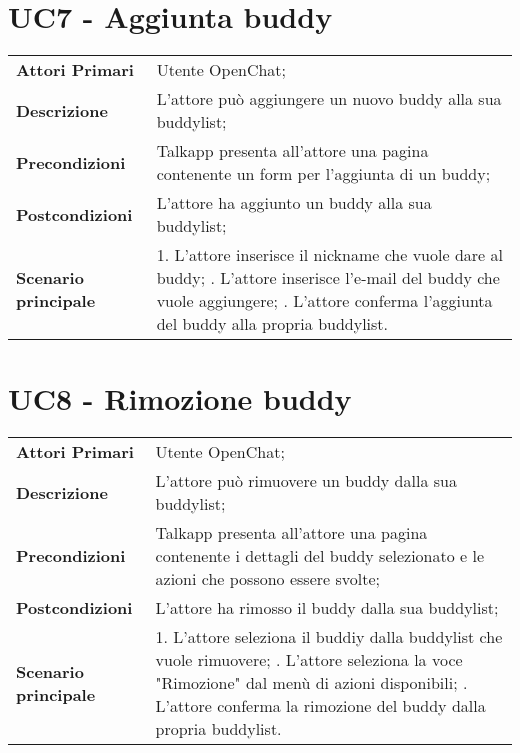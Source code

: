\section{UC7 - Aggiunta buddy}
\begin{center}
	\bgroup
	\def\arraystretch{1.8}     
	\begin{longtable}{  p{4cm} | p{9.5cm} } 
		\textbf{Attori Primari} & Utente OpenChat; \\ 
		\textbf{Descrizione} &  L'attore può aggiungere un nuovo buddy alla sua buddylist; \\ 
		\textbf{Precondizioni}  & Talkapp presenta all'attore una pagina contenente un form per l'aggiunta di un buddy; \\
		\textbf{Postcondizioni} & L'attore ha aggiunto un buddy alla sua buddylist;  \\ 
		\textbf{Scenario principale} & 
		1. L'attore inserisce il nickname che vuole dare al buddy; \newline
		2. L'attore inserisce l'e-mail del buddy che vuole aggiungere; \newline
		3. L'attore conferma l'aggiunta del buddy alla propria buddylist.
	\end{longtable}
	\egroup
\end{center}

\section{UC8 - Rimozione buddy}
\begin{center}
	\bgroup
	\def\arraystretch{1.8}     
	\begin{longtable}{  p{4cm} | p{9.5cm} } 
		\textbf{Attori Primari} & Utente OpenChat; \\ 
		\textbf{Descrizione} &  L'attore può rimuovere un buddy dalla sua buddylist; \\ 
		\textbf{Precondizioni}  & Talkapp presenta all'attore una pagina contenente i dettagli del buddy selezionato e le azioni che possono essere svolte; \\
		\textbf{Postcondizioni} & L'attore ha rimosso il buddy dalla sua buddylist;  \\ 
		\textbf{Scenario principale} & 
		1. L'attore seleziona il buddiy dalla buddylist che vuole rimuovere; \newline
		2. L'attore seleziona la voce "Rimozione" dal menù di azioni disponibili; \newline
		3. L'attore conferma la rimozione del buddy dalla propria buddylist.
	\end{longtable}
	\egroup
\end{center}

